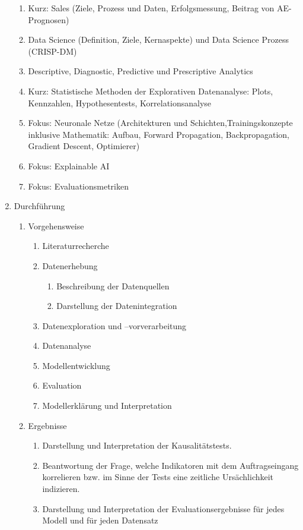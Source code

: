 \documentclass[lettersize,journal]{IEEEtran}
\begin{document}
\begin{enumerate}
\begin{enumerate}
    \item Kurz: Sales (Ziele, Prozess und Daten, Erfolgsmessung, Beitrag von AE-Prognosen)
    \item Data Science (Definition, Ziele, Kernaspekte) und Data Science Prozess (CRISP-DM)
    \item Descriptive, Diagnostic, Predictive und Prescriptive Analytics
    \item Kurz: Statistische Methoden der Explorativen Datenanalyse: Plots, Kennzahlen, Hypothesentests, Korrelationsanalyse
    \item Fokus: Neuronale Netze (Architekturen und Schichten,Trainingskonzepte inklusive Mathematik: Aufbau, Forward Propagation, Backpropagation, Gradient Descent, Optimierer)
    \item Fokus: Explainable AI
    \item Fokus: Evaluationsmetriken
  \end{enumerate}
  \item Durchführung
  \begin{enumerate}
    \item Vorgehensweise
    \begin{enumerate} 
      \item Literaturrecherche
      \item Datenerhebung 
      \begin{enumerate}
        \item Beschreibung der Datenquellen
        \item Darstellung der Datenintegration
      \end{enumerate}
      \item Datenexploration und –vorverarbeitung
      \item Datenanalyse
      \item Modellentwicklung
      \item Evaluation
      \item Modellerklärung und Interpretation
    \end{enumerate}
    \item Ergebnisse
    \begin{enumerate}
      \item Darstellung und Interpretation der Kausalitätstests.
      \item Beantwortung der Frage, welche Indikatoren mit dem Auftragseingang korrelieren bzw. im Sinne der Tests eine zeitliche Ursächlichkeit indizieren.
      \item Darstellung und Interpretation der Evaluationsergebnisse für jedes Modell und für jeden Datensatz

\end{enumerate}
\end{enumerate}
\end{enumerate}
\end{document}
